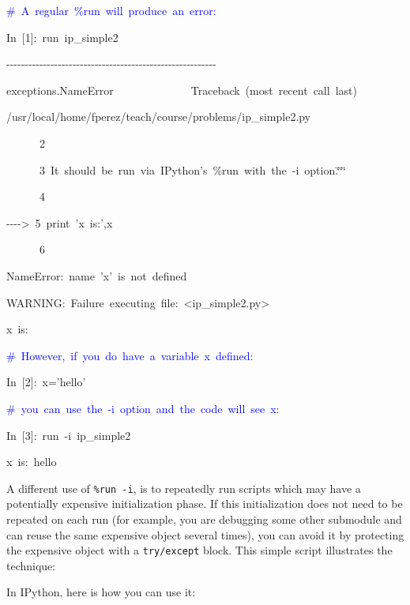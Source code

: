 \begin{lyxcode}
\textcolor{blue}{\#~A~regular~\%run~will~produce~an~error:}

In~{[}1]:~run~ip\_simple2

-{}-{}-{}-{}-{}-{}-{}-{}-{}-{}-{}-{}-{}-{}-{}-{}-{}-{}-{}-{}-{}-{}-{}-{}-{}-{}-{}-{}-{}-{}-{}-{}-{}-{}-{}-{}-{}-{}-{}-{}-{}-{}-{}-{}-{}-{}-{}-{}-{}-{}-{}-{}-{}-{}-{}-{}-

exceptions.NameError~~~~~~~~~~~~~~Traceback~(most~recent~call~last)

/usr/local/home/fperez/teach/course/problems/ip\_simple2.py

~~~~~~2

~~~~~~3~It~should~be~run~via~IPython's~\%run~with~the~-i~option.\char`\"{}\char`\"{}\char`\"{}

~~~~~~4

-{}-{}-{}->~5~print~'x~is:',x

~~~~~~6

NameError:~name~'x'~is~not~defined

WARNING:~Failure~executing~file:~<ip\_simple2.py>

x~is:

\textcolor{blue}{\#~However,~if~you~do~have~a~variable~x~defined:}

In~{[}2]:~x='hello'

\textcolor{blue}{\#~you~can~use~the~-i~option~and~the~code~will~see~x:}

In~{[}3]:~run~-i~ip\_simple2

x~is:~hello
\end{lyxcode}
A different use of \texttt{\%run -i}, is to repeatedly run scripts
which may have a potentially expensive initialization phase. If this
initialization does not need to be repeated on each run (for example,
you are debugging some other submodule and can reuse the same expensive
object several times), you can avoid it by protecting the expensive
object with a \texttt{try/except} block. This simple script illustrates
the technique:

In IPython, here is
how you can use it:

